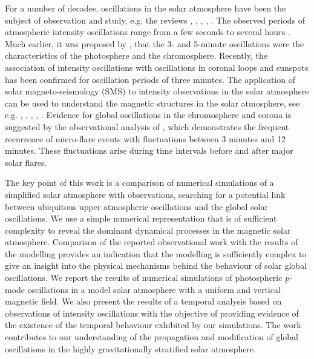 \documentclass[physics,article,submit,pdftex,moreauthors]{Definitions/mdpi}
\begin{document}
 For a number of decades, oscillations in the solar atmosphere have been the subject of observation and study, e.g. the reviews \cite{Banerjee2011}, \cite{deMoortel2009}, \cite{Mathioudakis2013}, \cite{Ruderman2009}, \cite{Wang2011}. The observed periods of atmospheric intensity oscillations range from  a few seconds to several hours \cite{Auchere2014}. Much earlier, it was proposed by \cite{Jensen1963}, that the 3- and 5-minute oscillations were the characteristics of the photosphere and the chromosphere. Recently, the association of intensity oscillations with oscillations in coronal loops and sunspots has been confirmed for oscillation periods of three minutes. The application of solar magneto-seismology (SMS) to intensity observations in the solar atmosphere can be used to understand the magnetic structures in the solar atmosphere, see e.g. \cite{Roberts1984}, \cite{Banerjee2007}, \cite{Zaqarashvili2007}, \cite{Erdelyi2008}, \cite{Verth2010}.  Evidence for global oscillations  in the chromosphere and corona is suggested by the observational analysis of \cite{Gyenge2018},  which demonstrates the frequent recurrence of micro-flare events with fluctuations between 3 minutes and 12 minutes. These fluctuations arise during time intervals before and after major solar flares.


The key point of this work is a comparison of numerical simulations  of a simplified solar atmosphere with observations, searching for a  potential link between ubiquitous upper atmospheric oscillations and the global solar oscillations. We use a  simple numerical representation that is of sufficient complexity to reveal the dominant dynamical processes in the magnetic solar atmosphere. Comparison of the reported observational work with the results of the modelling provides an indication that the modelling is sufficiently complex to give an insight into the physical mechanisms behind the behaviour of solar global oscillations. We report the results of numerical simulations of photospheric $p$-mode oscillations in a model solar atmosphere with a uniform and vertical magnetic field. We also present the results of a temporal analysis based on observations of intensity oscillations with the objective of providing evidence of the existence of the temporal behaviour exhibited by our simulations. The work contributes to our understanding of the propagation and modification of global oscillations in the highly gravitationally stratified solar atmosphere. 




\end{document}
